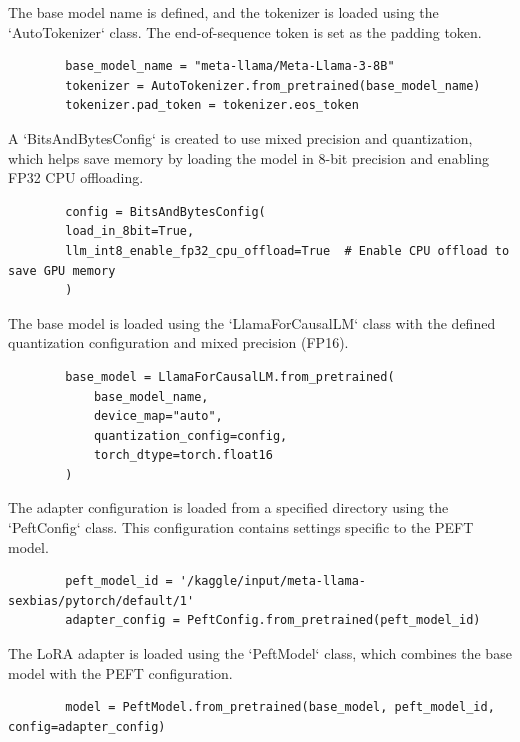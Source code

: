\documentclass{solutionclass} %
\begin{document}
\begin{solution}
	The base model name is defined, and the tokenizer is loaded using the `AutoTokenizer` class. The end-of-sequence token is set as the padding token.
	\begin{lstlisting}
		base_model_name = "meta-llama/Meta-Llama-3-8B"
		tokenizer = AutoTokenizer.from_pretrained(base_model_name)
		tokenizer.pad_token = tokenizer.eos_token
	\end{lstlisting}
\end{solution}

\begin{solution}
	A `BitsAndBytesConfig` is created to use mixed precision and quantization, which helps save memory by loading the model in 8-bit precision and enabling FP32 CPU offloading.
	\begin{lstlisting}
		config = BitsAndBytesConfig(
		load_in_8bit=True,
		llm_int8_enable_fp32_cpu_offload=True  # Enable CPU offload to save GPU memory
		)
	\end{lstlisting}
\end{solution}

\begin{solution}
	The base model is loaded using the `LlamaForCausalLM` class with the defined quantization configuration and mixed precision (FP16).
	\begin{lstlisting}
		base_model = LlamaForCausalLM.from_pretrained(
			base_model_name,
			device_map="auto",
			quantization_config=config,
			torch_dtype=torch.float16
		)
		\end{lstlisting}
\end{solution}

\begin{solution}
	The adapter configuration is loaded from a specified directory using the `PeftConfig` class. This configuration contains settings specific to the PEFT model.
	\begin{lstlisting}
		peft_model_id = '/kaggle/input/meta-llama-sexbias/pytorch/default/1'
		adapter_config = PeftConfig.from_pretrained(peft_model_id)
	\end{lstlisting}
\end{solution}

\begin{solution}
	The LoRA adapter is loaded using the `PeftModel` class, which combines the base model with the PEFT configuration.
	\begin{lstlisting}
		model = PeftModel.from_pretrained(base_model, peft_model_id, config=adapter_config)
	\end{lstlisting}
\end{solution}
\end{document}

